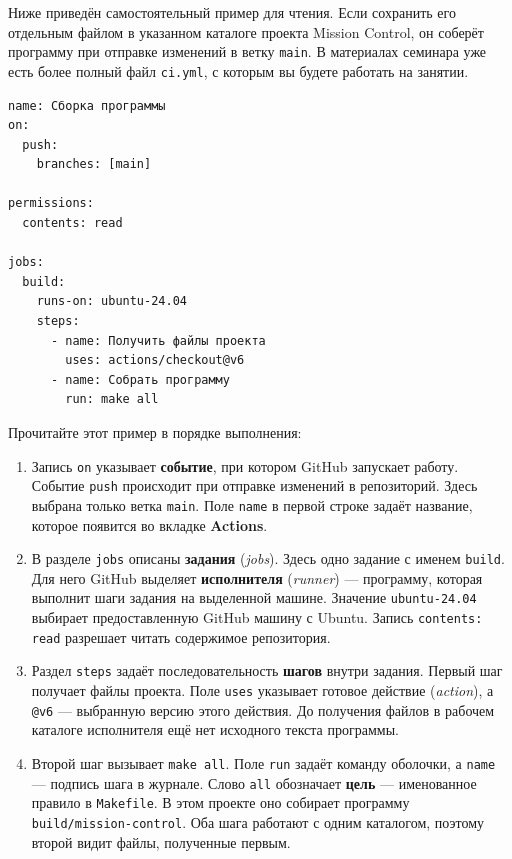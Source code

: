 Ниже приведён самостоятельный пример для чтения. Если сохранить его отдельным файлом в указанном каталоге проекта Mission Control, он соберёт программу при отправке изменений в ветку \texttt{main}. В материалах семинара уже есть более полный файл \texttt{ci.yml}, с которым вы будете работать на занятии.

\begin{verbatim}
name: Сборка программы
on:
  push:
    branches: [main]

permissions:
  contents: read

jobs:
  build:
    runs-on: ubuntu-24.04
    steps:
      - name: Получить файлы проекта
        uses: actions/checkout@v6
      - name: Собрать программу
        run: make all
\end{verbatim}

Прочитайте этот пример в порядке выполнения:

\begin{enumerate}
\item Запись \texttt{on} указывает \textbf{событие}, при котором GitHub запускает работу. Событие \texttt{push} происходит при отправке изменений в репозиторий. Здесь выбрана только ветка \texttt{main}. Поле \texttt{name} в первой строке задаёт название, которое появится во вкладке \textbf{Actions}.
\item В разделе \texttt{jobs} описаны \textbf{задания} (\emph{jobs}). Здесь одно задание с именем \texttt{build}. Для него GitHub выделяет \textbf{исполнителя} (\emph{runner}) — программу, которая выполнит шаги задания на выделенной машине. Значение \texttt{ubuntu-24.04} выбирает предоставленную GitHub машину с Ubuntu. Запись \texttt{contents: read} разрешает читать содержимое репозитория.
\item Раздел \texttt{steps} задаёт последовательность \textbf{шагов} внутри задания. Первый шаг получает файлы проекта. Поле \texttt{uses} указывает готовое действие (\emph{action}), а \texttt{@v6} — выбранную версию этого действия. До получения файлов в рабочем каталоге исполнителя ещё нет исходного текста программы.
\item Второй шаг вызывает \texttt{make all}. Поле \texttt{run} задаёт команду оболочки, а \texttt{name} — подпись шага в журнале. Слово \texttt{all} обозначает \textbf{цель} — именованное правило в \texttt{Makefile}. В этом проекте оно собирает программу \texttt{build/mission-control}. Оба шага работают с одним каталогом, поэтому второй видит файлы, полученные первым.
\end{enumerate}

